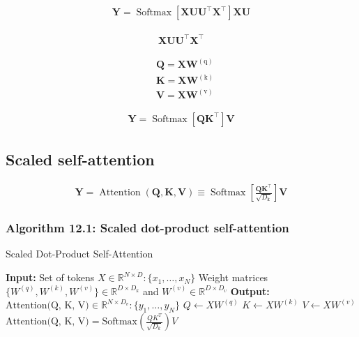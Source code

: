 \documentclass{article}
\begin{document}
\begin{align*}
\mathbf{Y}=\operatorname{Softmax}\left[
\mathbf{X} \mathbf{U} \mathbf{U}^{\top} \mathbf{X}^{\top}\right]
\mathbf{X} \mathbf{U} \tag{12.8}
\end{align*}

\begin{align*}
\mathbf{X} \mathbf{U} \mathbf{U}^{\top} \mathbf{X}^{\top} \tag{12.9}
\end{align*}

\begin{align*}
& \mathbf{Q}=\mathbf{X} \mathbf{W}^{(\mathrm{q})}  \tag{12.10}\\
& \mathbf{K}=\mathbf{X} \mathbf{W}^{(\mathrm{k})}  \tag{12.11}\\
& \mathbf{V}=\mathbf{X} \mathbf{W}^{(\mathrm{v})} \tag{12.12}
\end{align*}

\begin{align*}
\mathbf{Y}=\operatorname{Softmax}\left[
\mathbf{Q K}^{\top}\right]
\mathbf{V} \tag{12.13}
\end{align*}

\subsection{Scaled self-attention}

\begin{align*}
\mathbf{Y}=\operatorname{Attention}(\mathbf{Q}, \mathbf{K}, \mathbf{V}) \equiv \operatorname{Softmax}\left[
\frac{\mathbf{Q K}^{\top}}{\sqrt{D_{\mathrm{k}}}}\right]
\mathbf{V} \tag{12.14}
\end{align*}

\subsubsection{Algorithm 12.1: Scaled dot-product self-attention}

\begin{algorithm}[H]
\caption{Scaled Dot-Product Self-Attention}
\begin{algorithmic}[1]
\STATE \textbf{Input:} Set of tokens $X \in \mathbb{R}^{N \times D} : \{x_1, \ldots, x_N\}$
\STATE \quad Weight matrices $\{W^{(q)}, W^{(k)}, W^{(v)}\} \in \mathbb{R}^{D \times D_k}$ and $W^{(v)} \in \mathbb{R}^{D \times D_v}$
\STATE \textbf{Output:} $\text{Attention(Q, K, V)} \in \mathbb{R}^{N \times D_v} : \{y_1, \ldots, y_N\}$
\STATE $Q \gets X W^{(q)}$ 
\STATE $K \gets X W^{(k)}$ 
\STATE $V \gets X W^{(v)}$ 
\RETURN $\text{Attention(Q, K, V)} = \text{Softmax}\left(\frac{Q K^T}{\sqrt{D_k}}\right) V$
\end{algorithmic}
\end{algorithm}
\end{document}
